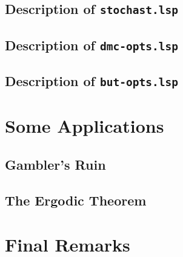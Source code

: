 \subsection{Description of {\tt stochast.lsp}}
\label{subsec:stochast}


\subsection{Description of {\tt dmc-opts.lsp}}
\label{subsec:dmc-opts}


\subsection{Description of {\tt but-opts.lsp}}
\label{subsec:but-opts}


\section{Some Applications}
\label{sec:applications}


\subsection{Gambler's Ruin}
\label{subsec:gambler}


\subsection{The Ergodic Theorem}
\label{subsec:theorem}


\section{Final Remarks}
\label{sec:remarks}


\begin{thebibliography}{99}

\end{thebibliography}
















